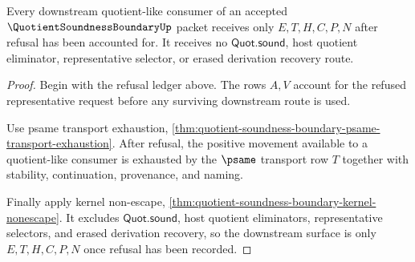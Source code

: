 \begin{theorem}
\label{thm:quotient-soundness-boundary-downstream-nonescape}
Every downstream quotient-like consumer of an accepted $\QuotientSoundnessBoundaryUp$ packet receives only $E,T,H,C,P,N$ after refusal has been accounted for. It receives no $\mathsf{Quot.sound}$, host quotient eliminator, representative selector, or erased derivation recovery route.
\end{theorem}
\begin{proof}
Begin with the refusal ledger above. The rows $A,V$ account for the refused representative request before any surviving downstream route is used.

Use psame transport exhaustion, \autoref{thm:quotient-soundness-boundary-psame-transport-exhaustion}. After refusal, the positive movement available to a quotient-like consumer is exhausted by the $\psame$ transport row $T$ together with stability, continuation, provenance, and naming.

Finally apply kernel non-escape, \autoref{thm:quotient-soundness-boundary-kernel-nonescape}. It excludes $\mathsf{Quot.sound}$, host quotient eliminators, representative selectors, and erased derivation recovery, so the downstream surface is only $E,T,H,C,P,N$ once refusal has been recorded.
\end{proof}

